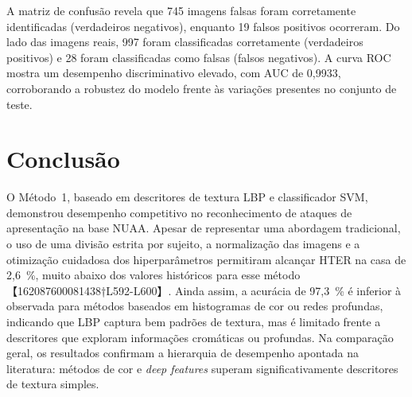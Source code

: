 \documentclass[
    article,
    11pt,
    oneside,
    a4paper,
    english,
    brazil,
    sumario=tradicional
]{abntex2}
\begin{document}
A matriz de confusão revela que 745 imagens falsas foram corretamente identificadas (verdadeiros negativos), enquanto 19 falsos positivos ocorreram. Do lado das imagens reais, 997 foram classificadas corretamente (verdadeiros positivos) e 28 foram classificadas como falsas (falsos negativos). A curva ROC mostra um desempenho discriminativo elevado, com AUC de 0,9933, corroborando a robustez do modelo frente às variações presentes no conjunto de teste.

\section*{Conclusão}

O Método 1, baseado em descritores de textura LBP e classificador SVM, demonstrou desempenho competitivo no reconhecimento de ataques de apresentação na base NUAA. Apesar de representar uma abordagem tradicional, o uso de uma divisão estrita por sujeito, a normalização das imagens e a otimização cuidadosa dos hiperparâmetros permitiram alcançar HTER na casa de 2,6 \%, muito abaixo dos valores históricos para esse método【162087600081438†L592-L600】. Ainda assim, a acurácia de 97,3 \% é inferior à observada para métodos baseados em histogramas de cor ou redes profundas, indicando que LBP captura bem padrões de textura, mas é limitado frente a descritores que exploram informações cromáticas ou profundas. Na comparação geral, os resultados confirmam a hierarquia de desempenho apontada na literatura: métodos de cor e \emph{deep features} superam significativamente descritores de textura simples.
\end{document}
